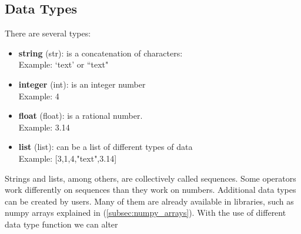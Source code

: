 \documentclass[10pt,a4paper]{article}
\begin{document}
\subsection{Data Types}
\label{subsec:data_types}
There are several types:
\begin{itemize}
    \item \textbf{string} (str): is a concatenation of characters:\\
    Example: `text' or ``text"
    \item \textbf{integer} (int): is an integer number\\
    Example: 4
    \item \textbf{float} (float): is a rational number.\\
    Example: 3.14
    \item \textbf{list} (list): can be a list of different types of data\\
    Example: [3,1,4,"text",3.14]
\end{itemize}
Strings and lists, among others, are collectively called sequences. Some operators work differently on sequences than they work on numbers.
Additional data types can be created by users. Many of them are already available in libraries, such as numpy arrays explained in (\ref{subsec:numpy_arrays}).
With the use of different data type function we can alter 
\end{document}
